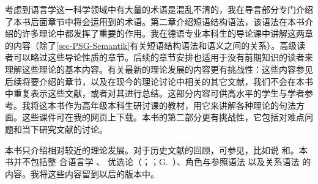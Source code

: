考虑到语言学这一科学领域中有大量的术语是混乱不清的，我在导言部分专门介绍了本书后面章节中将会运用到的术语。第二章介绍短语结构语法，该语法在本书介绍的许多理论中都发挥了重要的作用。我在德语专业本科生的导论课中讲解这两章的内容（除了\ref{sec-PSG-Semantik}有关短语结构语法和语义之间的关系）。高级读者可以略过这些导论性质的章节。后续的章节安排也适用于没有前期知识的读者来理解这些理论的基本内容。有关最新的理论发展的内容更有挑战性：这些内容参见后续将要介绍的章节，以及在现今的理论讨论中相关的其它文献，我们不会在本书中重复表示这些文献，或者对其进行总结。这部分内容可供高水平的学生与学者参考。我将这本书作为高年级本科生研讨课的教材，用它来讲解各种理论的句法方面。这些课件可在我的网页上下载。本书的第二部分更有挑战性，它包括对难点问题和当下研究文献的讨论。

本书只介绍相对较近的理论发展。对于历史文献的回顾，可参见，比如说 \citet{Robins97a-u}和\citet{JL2006a-u}。本书并不包括整
合语言学 \citep{Lieb83a-u,Eisenberg2004a,Nolda2007a-u}、
优选论\indexot（\citealp{PS93a-u}；\citealp{Grimshaw97a-u}；G.\ \citealp{GMueller2000a-u}）、角色与参照语法 \citep{vanValin93a-ed}以及关系语法
 \citep{Perlmutter83a-ed,Perlmutter84b-ed}的内容。我将这些内容留到以后的版本中。

